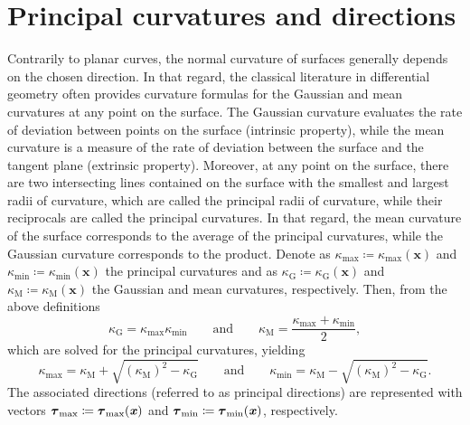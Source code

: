 
\chapter{Principal curvatures and directions}
\label{chap:appendix_principal_curvatures_and_directions}

Contrarily to planar curves, the normal curvature of surfaces generally depends on the chosen direction.
In that regard, the classical literature in differential geometry often provides curvature formulas for the Gaussian and mean curvatures at any point on the surface.
The Gaussian curvature evaluates the rate of deviation between points on the surface (intrinsic property), while the mean curvature is a measure of the rate of deviation between the surface and the tangent plane (extrinsic property).
Moreover, at any point on the surface, there are two intersecting lines contained on the surface with the smallest and largest radii of curvature, which are called the principal radii of curvature, while their reciprocals are called the principal curvatures.
In that regard, the mean curvature of the surface corresponds to the average of the principal curvatures, while the Gaussian curvature corresponds to the product.
Denote as $\kappa_{\textrm{max}}\coloneqq\kappa_{\textrm{max}}\left(\bm{x}\right)$ and $\kappa_{\textrm{min}}\coloneqq\kappa_{\textrm{min}}\left(\bm{x}\right)$ the principal curvatures and as $\kappa_{\textrm{G}}\coloneqq\kappa_{\textrm{G}}\left(\bm{x}\right)$ and $\kappa_{\textrm{M}}\coloneqq\kappa_{\textrm{M}}\left(\bm{x}\right)$ the Gaussian and mean curvatures, respectively.
Then, from the above definitions
\begin{equation}
\kappa_{\textrm{G}}=\kappa_{\textrm{max}}\kappa_{\textrm{min}}
\qquad
\textrm{and}
\qquad
\kappa_{\textrm{M}}=\dfrac{\kappa_{\textrm{max}}+\kappa_{\textrm{min}}}{2},
\end{equation}
which are solved for the principal curvatures, yielding
\begin{equation}
\label{eq:appendix_gaussian_and_mean_curvatures}
\kappa_{\textrm{max}}=\kappa_{\textrm{M}}+\sqrt{\left(\kappa_{\textrm{M}}\right)^{2}-\kappa_{\textrm{G}}}
\qquad
\textrm{and}
\qquad
\kappa_{\textrm{min}}=\kappa_{\textrm{M}}-\sqrt{\left(\kappa_{\textrm{M}}\right)^{2}-\kappa_{\textrm{G}}}.
\end{equation}
The associated directions (referred to as principal directions) are represented with vectors $\bs{\tau}_{\textrm{max}}\coloneqq\bs{\tau}_{\textrm{max}}\left(\bm{x}\right)$ and $\bs{\tau}_{\textrm{min}}\coloneqq\bs{\tau}_{\textrm{min}}\left(\bm{x}\right)$, respectively.
